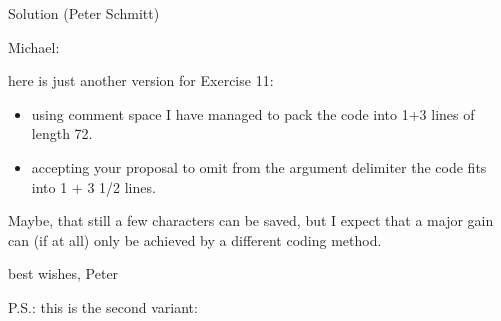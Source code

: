 \begin{solution}{Solution (Peter Schmitt)}
\begin{lcode}
\let~\catcode~` 13\let \let \u\uccode \b{ \e\expandafter \c\count{~` 14
\end{lcode}
 Michael:

 here is just another version for Exercise 11:

\begin{itemize}
\item using comment space I have managed to pack the code into 1+3 lines of
   length 72.
\item accepting your proposal to omit  from the argument delimiter the
   code fits into 1 + 3 1/2 lines.
\end{itemize}
 Maybe, that still a few characters can be saved, but I expect that a
 major gain can (if at all) only be achieved by a different coding method.

 best wishes, Peter

 P.S.: this is the second variant:

\end{solution}
